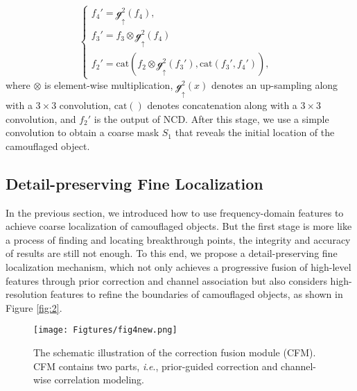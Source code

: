 \documentclass[sigconf,screen]{acmart}
\newcommand{\ie}{\textit{i}.\textit{e}.}
\begin{document}
\begin{equation}
\left\{
             \begin{array}{lr}
             f_4'=\mathscr{g^2_\uparrow}(f_4), &  \\
             f_3'=f_3 \otimes \mathscr{g^2_\uparrow}(f_4)\\
             f_2'= \mathrm{cat}(f_2 \otimes \mathscr{g^2_\uparrow} (f_3'),\mathrm{cat}(f_3',f_4')), &  
             \end{array}
\right.
    \label{eq3}
\end{equation}
where \(\otimes\) is element-wise multiplication, \(\mathscr{g^2_\uparrow}(x)\) denotes an up-sampling along with a $3 \times 3$ convolution, $\mathrm{cat}()$ denotes concatenation along with a $3 \times 3$ convolution, and \(f_2'\)  is the output of NCD. 
After this stage, we use a simple convolution to obtain a coarse mask $S_1$ that reveals the initial location of the camouflaged object.



\subsection {Detail-preserving Fine Localization}

In the previous section, we introduced how to use frequency-domain features to achieve coarse localization of camouflaged objects. But the first stage is more like a process of finding and locating breakthrough points, the integrity and accuracy of results are still not enough. To this end, we propose a detail-preserving fine localization mechanism, which not only achieves a progressive fusion of high-level features through prior correction and channel association but also considers high-resolution features to refine the boundaries of camouflaged objects, as shown in Figure \ref{fig:2}. 


\begin{figure}[!t]
\centering
\texttt{[image: Figtures/fig4new.png]}
\caption{The schematic illustration of the correction fusion module (CFM). CFM contains two parts, \ie, prior-guided correction and channel-wise correlation modeling. }
\label{fig:5}
\end{figure}


\end{document}
